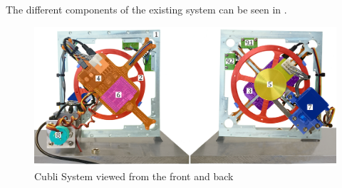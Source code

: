 The different components of the existing system can be seen in .
%
%
\begin{figure}[H]
	\centering
	\includegraphics[scale=0.27]{figures/Cubli12}
	\caption{Cubli System viewed from the front and back}
	\label{Cubli-12}
\end{figure}
%
